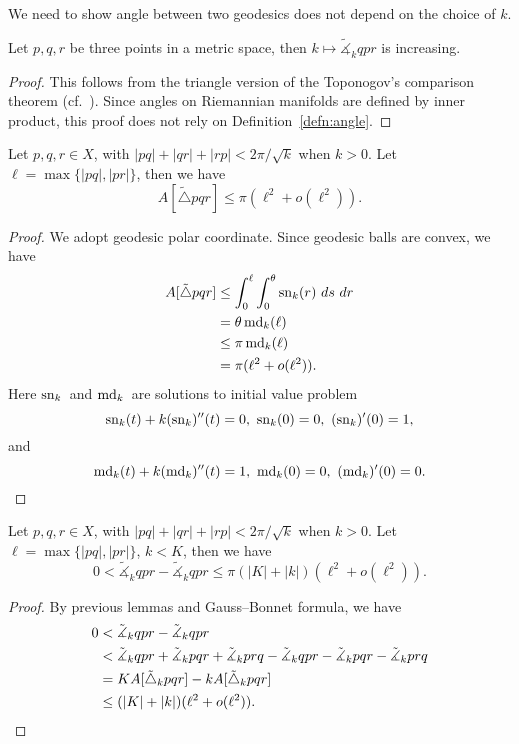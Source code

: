 We need to show angle between two geodesics does not depend on the choice of $k$.

\begin{lem}
    Let $p,q,r$ be three points in a metric space, then $k\mapsto\tilde{\measuredangle}_kqpr$ is increasing.
\end{lem}
\begin{proof}
    This follows from the triangle version of the Toponogov's comparison theorem (cf.~\cite[Theorem 12.2.2]{petersenRiemannianGeometry2016}).
    Since angles on Riemannian manifolds are defined by inner product, this proof does not rely on Definition~\ref{defn:angle}.
\end{proof}

\begin{lem}
    Let $p,q,r\in X$, with $|pq|+|qr|+|rp|<2\pi/\sqrt{k}$ when $k>0$.
    Let $\ell=\max\{|pq|,|pr|\}$, then we have
    \[A[\tilde{\triangle}pqr]\leq\pi(\ell^2+o(\ell^2)).\]
\end{lem}
\begin{proof}
    We adopt geodesic polar coordinate.
    Since geodesic balls are convex, we have
    \begin{align*}
        A[\tilde{\triangle}pqr]&\leq\int_{0}^{\ell}\int_{0}^{\theta}\sn_k(r)\ ds\ dr\\
        &=\theta\md_k(\ell)\\
        &\leq\pi\md_k(\ell)\\
        &=\pi(\ell^2+o(\ell^2)).
    \end{align*}
    Here $\operatorname{sn}_k{}$ and $\operatorname{md}_k{}$ are solutions to initial value problem
    \[\sn_k(t)+k(\sn_k)''(t)=0,\ \sn_k(0)=0,\ (\sn_k)'(0)=1,\]
    and
    \[\md_k(t)+k(\md_k)''(t)=1,\ \md_k(0)=0,\ (\md_k)'(0)=0.\qedhere\]
\end{proof}

\begin{lem}
    Let $p,q,r\in X$, with $|pq|+|qr|+|rp|<2\pi/\sqrt{k}$ when $k>0$.
    Let $\ell=\max\{|pq|,|pr|\}$, $k<K$, then we have
    \begin{equation}
        0<\tilde{\measuredangle}_kqpr-\tilde{\measuredangle}_kqpr\leq\pi(|K|+|k|)(\ell^2+o(\ell^2)).\label{eq:lem angle}
    \end{equation}
\end{lem}
\begin{proof}
    By previous lemmas and Gauss--Bonnet formula, we have
    \begin{align*}
        0&<\tilde{\measuredangle}_kqpr-\tilde{\measuredangle}_kqpr\\
        &<\tilde{\measuredangle}_kqpr+\tilde{\measuredangle}_kpqr+\tilde{\measuredangle}_kprq-\tilde{\measuredangle}_kqpr-\tilde{\measuredangle}_kpqr-\tilde{\measuredangle}_kprq\\
        &=KA[\tilde{\triangle}_kpqr]-kA[\tilde{\triangle}_kpqr]\\
        &\leq(|K|+|k|)(\ell^2+o(\ell^2)).\qedhere
    \end{align*}
\end{proof}


